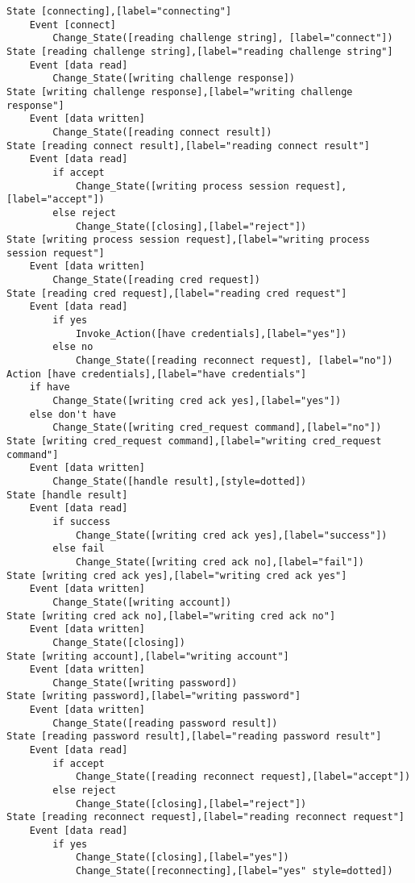 \begin{comment}
This is the state machine for the smpd connect command.
Graph [smpd connect],
      [size="7.5, 10"]
\end{comment}
\begin{verbatim}
State [connecting],[label="connecting"]
	Event [connect]
		Change_State([reading challenge string], [label="connect"])
State [reading challenge string],[label="reading challenge string"]
	Event [data read]
		Change_State([writing challenge response])
State [writing challenge response],[label="writing challenge response"]
	Event [data written]
		Change_State([reading connect result])
State [reading connect result],[label="reading connect result"]
	Event [data read]
		if accept
			Change_State([writing process session request],[label="accept"])
		else reject
			Change_State([closing],[label="reject"])
State [writing process session request],[label="writing process session request"]
	Event [data written]
		Change_State([reading cred request])
State [reading cred request],[label="reading cred request"]
	Event [data read]
		if yes
			Invoke_Action([have credentials],[label="yes"])
		else no
			Change_State([reading reconnect request], [label="no"])
Action [have credentials],[label="have credentials"]
	if have
		Change_State([writing cred ack yes],[label="yes"])
	else don't have
		Change_State([writing cred_request command],[label="no"])
State [writing cred_request command],[label="writing cred_request command"]
	Event [data written]
		Change_State([handle result],[style=dotted])
State [handle result]
	Event [data read]
		if success
			Change_State([writing cred ack yes],[label="success"])
		else fail
			Change_State([writing cred ack no],[label="fail"])
State [writing cred ack yes],[label="writing cred ack yes"]
	Event [data written]
		Change_State([writing account])
State [writing cred ack no],[label="writing cred ack no"]
	Event [data written]
		Change_State([closing])
State [writing account],[label="writing account"]
	Event [data written]
		Change_State([writing password])
State [writing password],[label="writing password"]
	Event [data written]
		Change_State([reading password result])
State [reading password result],[label="reading password result"]
	Event [data read]
		if accept
			Change_State([reading reconnect request],[label="accept"])
		else reject
			Change_State([closing],[label="reject"])
State [reading reconnect request],[label="reading reconnect request"]
	Event [data read]
		if yes
			Change_State([closing],[label="yes"])
			Change_State([reconnecting],[label="yes" style=dotted])

\end{verbatim}
